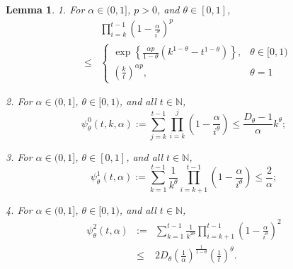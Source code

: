 \documentclass[twoside,twocolumn,journal]{IEEEtran}
\newtheorem{lem}[thm]{Lemma}
\newcommand{\DS}{\displaystyle}
\def\N{{\mathbb N}}
\begin{document}
%
%

\begin{lem} \label{lem:estimates}
1. For $\alpha\in (0,1]$, $p>0$, and $\theta\in [0,1]$,
\begin{eqnarray*}
& & \prod_{i=k}^{t-1} \left(1-\frac{\alpha}{i^\theta}\right)^p \\
& \leq & \DS
\left\{
\begin{array}{ll}
\DS \exp\left\{\frac{\alpha p}{1-\theta} (k^{1-\theta}-t^{1-\theta})\right\}, & \theta\in [0,1) \\
\DS \left(\frac{k}{t}\right)^{\alpha p}, & \theta = 1
\end{array}
\right.
\end{eqnarray*}

2. For $\alpha\in (0,1]$, $\theta\in [0,1)$, and all $t\in \N$,
\[ \psi^0_\theta(t,k,\alpha):=\sum_{j=k}^{t-1} \prod_{i=k}^j \left(1 - \frac{\alpha}{i^\theta} \right)
\leq \frac{D_\theta-1}{\alpha} k^{\theta};
\]

3. For $\alpha\in (0,1]$, $\theta\in [0,1]$, and all
$t\in \N$,
\[ \psi^1_\theta(t,\alpha):=\sum_{k=1}^{t-1} \frac{1}{k^\theta} \prod_{i=k+1}^{t-1} \left(1-\frac{\alpha}{i^\theta}\right) \leq \frac{2}{\alpha}; \]

4. For $\alpha\in (0,1]$, $\theta\in [0,1)$, and all $t\in \N$,
\begin{eqnarray*}
 \psi^2_\theta(t,\alpha) & := & \sum_{k=1}^{t-1} \frac{1}{k^{2\theta}} \prod_{i=k+1}^{t-1} \left(1-\frac{\alpha}{i^\theta}\right)^2 \\
 & \leq & 2 D_\theta \left(\frac{1}{\alpha} \right)^{\frac{1}{1-\theta}} \left(\frac{1}{t}\right)^{\theta}.
\end{eqnarray*}
\end{lem}
\end{document}
